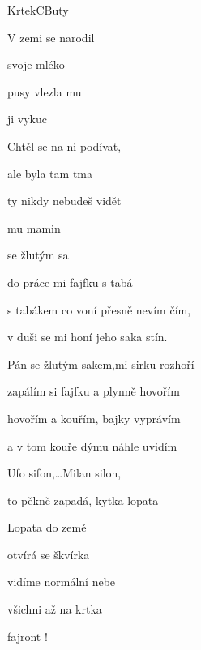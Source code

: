 ﻿\begin{song}{Krtek}{C}{Buty}

\begin{SBChorus*}

V zemi se narodil 

 svoje mléko 

 pusy vlezla mu 

 ji vykuc 

Chtěl se na ni podívat,

ale byla tam tma

ty nikdy nebudeš vidět

 mu mamin

\end{SBChorus*}

\begin{SBChorus*}

 se žlutým sa

do práce mi  fajfku s tabá

s tabákem co voní přesně nevím čím,

v duši se mi honí jeho saka stín.

Pán se žlutým sakem,mi sirku rozhoří

zapálím si fajfku a plynně hovořím

hovořím a kouřím, bajky vyprávím

a v tom kouře dýmu náhle uvidím

Ufo sifon,…Milan silon,

to pěkně zapadá, kytka lopata

\end{SBChorus*}

\begin{SBChorus*}

Lopata do země

otvírá se škvírka

vidíme normální nebe

všichni až na krtka

fajront !

\end{SBChorus*}

\end{song}

\clearpage